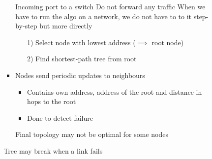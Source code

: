 \begin{itemize}
\begin{itemize}
\begin{itemize}
\begin{itemize}
                             Incoming port to a switch
                             Do not forward any traffic
                             When we have to run the algo on a network, we do not have to to it step-by-step but more directly
                                \begin{itemize}
                                    \item[1)] Select node with lowest address ($\implies$ root node)
                                    \item[2)] Find shortest-path tree from root
                                \end{itemize}
                            \item Nodes send periodic updates to neighbours
                                \begin{itemize}
                                    \item Contains own address, address of the root and distance in hops to the root
                                    \item Done to detect failure
                                \end{itemize}
                            \icon Final topology may not be optimal for some nodes
                        \end{itemize}
                    \icon Tree may break when a link fails
                \end{itemize}
        \end{itemize}
\end{itemize}

